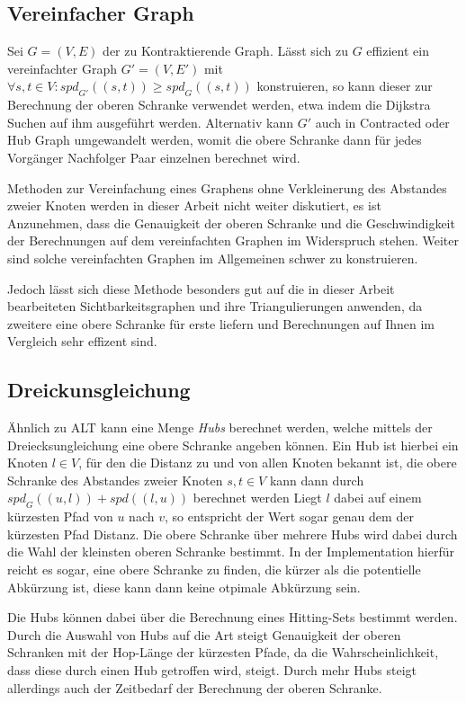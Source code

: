 \subsection{Vereinfacher Graph}
Sei $G = (V, E)$ der zu Kontraktierende Graph.
Lässt sich zu $G$ effizient ein vereinfachter Graph $G' = (V, E')$ mit $\forall s, t \in V \colon {spd}_{G'} ((s, t)) \geq {spd}_{G} ((s, t))$ konstruieren, so kann dieser zur Berechnung der oberen Schranke verwendet werden, etwa indem die Dijkstra Suchen auf ihm ausgeführt werden.
Alternativ kann $G'$ auch in Contracted oder Hub Graph umgewandelt werden, womit die obere Schranke dann für jedes Vorgänger Nachfolger Paar einzelnen berechnet wird.

Methoden zur Vereinfachung eines Graphens ohne Verkleinerung des Abstandes zweier Knoten werden in dieser Arbeit nicht weiter diskutiert, es ist Anzunehmen, dass die Genauigkeit der oberen Schranke und die Geschwindigkeit der Berechnungen auf dem vereinfachten Graphen im Widerspruch stehen.
Weiter sind solche vereinfachten Graphen im Allgemeinen schwer zu konstruieren.

Jedoch lässt sich diese Methode besonders gut auf die in dieser Arbeit bearbeiteten Sichtbarkeitsgraphen und ihre Triangulierungen anwenden, da zweitere eine obere Schranke für erste liefern und Berechnungen auf Ihnen im Vergleich sehr effizent sind.

\subsection{Dreickunsgleichung}
Ähnlich zu ALT\cite{goldberg2005computing} kann eine Menge \emph{Hubs} berechnet werden, welche mittels der Dreiecksungleichung eine obere Schranke angeben können.
Ein Hub ist hierbei ein Knoten $l \in V$, für den die Distanz zu und von allen Knoten bekannt ist, die obere Schranke des Abstandes zweier Knoten $s, t \in V$ kann dann durch ${spd}_G ((u, l)) + {spd}((l, u))$ berechnet werden
Liegt $l$ dabei auf einem kürzesten Pfad von $u$ nach $v$, so entspricht der Wert sogar genau dem der kürzesten Pfad Distanz.
Die obere Schranke über mehrere Hubs wird dabei durch die Wahl der kleinsten oberen Schranke bestimmt.
In der Implementation hierfür reicht es sogar, eine obere Schranke zu finden, die kürzer als die potentielle Abkürzung ist, diese kann dann keine otpimale Abkürzung sein.

Die Hubs können dabei über die Berechnung eines Hitting-Sets bestimmt werden.
Durch die Auswahl von Hubs auf die Art steigt Genauigkeit der oberen Schranken mit der Hop-Länge der kürzesten Pfade, da die Wahrscheinlichkeit, dass diese durch einen Hub getroffen wird, steigt.
Durch mehr Hubs steigt allerdings auch der Zeitbedarf der Berechnung der oberen Schranke.

